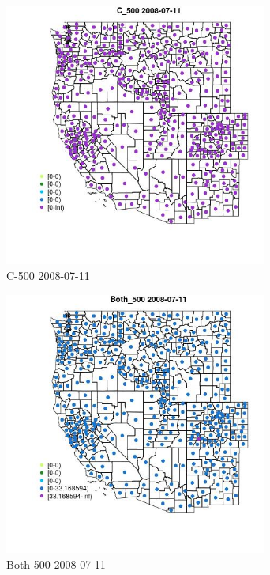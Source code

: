 \begin{figure} 
\centering  
\includegraphics[width=0.77\textwidth]{Code_Outputs/df_report_ML_predictors_CountyCentroid_Locations_Dates_2008-01-01to2018-12-31_MapObsC_5002008-07-11.jpg} 
\caption{\label{fig:df_report_ML_predictors_CountyCentroid_Locations_Dates_2008-01-01to2018-12-31MapObsC_5002008-07-11}C-500 2008-07-11} 
\end{figure} 
 

\begin{figure} 
\centering  
\includegraphics[width=0.77\textwidth]{Code_Outputs/df_report_ML_predictors_CountyCentroid_Locations_Dates_2008-01-01to2018-12-31_MapObsBoth_5002008-07-11.jpg} 
\caption{\label{fig:df_report_ML_predictors_CountyCentroid_Locations_Dates_2008-01-01to2018-12-31MapObsBoth_5002008-07-11}Both-500 2008-07-11} 
\end{figure} 
 

